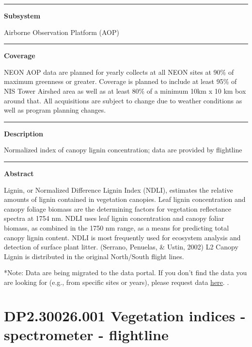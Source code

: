 \documentclass[]{article}
\begin{document}
\begin{center}\rule{0.5\linewidth}{\linethickness}\end{center}

\textbf{Subsystem}

Airborne Observation Platform (AOP)

\begin{center}\rule{0.5\linewidth}{\linethickness}\end{center}

\textbf{Coverage}

NEON AOP data are planned for yearly collects at all NEON sites at 90\%
of maximum greenness or greater. Coverage is planned to include at least
95\% of NIS Tower Airshed area as well as at least 80\% of a minimum
10km x 10 km box around that. All acquisitions are subject to change due
to weather conditions as well as program planning changes.

\begin{center}\rule{0.5\linewidth}{\linethickness}\end{center}

\textbf{Description}

Normalized index of canopy lignin concentration; data are provided by
flightline

\begin{center}\rule{0.5\linewidth}{\linethickness}\end{center}

\textbf{Abstract}

Lignin, or Normalized Difference Lignin Index (NDLI), estimates the
relative amounts of lignin contained in vegetation canopies. Leaf lignin
concentration and canopy foliage biomass are the determining factors for
vegetation reflectance spectra at 1754 nm. NDLI uses leaf lignin
concentration and canopy foliar biomass, as combined in the 1750 nm
range, as a means for predicting total canopy lignin content. NDLI is
most frequently used for ecosystem analysis and detection of surface
plant litter. (Serrano, Penuelas, \& Ustin, 2002) L2 Canopy Lignin is
distributed in the original North/South flight lines.

*Note: Data are being migrated to the data portal. If you don't find the
data you are looking for (e.g., from specific sites or years), please
request data
\href{http://www.neonscience.org/request-airborne-data}{here}. \newpage
.

\section{DP2.30026.001 Vegetation indices - spectrometer -
flightline}\label{dp2.30026.001-vegetation-indices---spectrometer---flightline}
\end{document}

